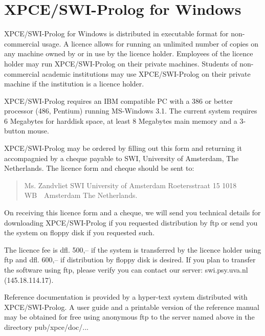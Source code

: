 \setlength{\textwidth}{6in}
\setlength{\textheight}{9in}
\setlength{\oddsidemargin}{1cm}
\setlength{\evensidemargin}{1cm}
\setlength{\parindent}{0in}
\setlength{\parskip}{5pt}
\nofiles


\section*{XPCE/SWI-Prolog for Windows}

XPCE/SWI-Prolog for Windows is distributed in executable format for
non-commercial usage.  A licence allows for running an unlimited number
of copies on any machine owned by or in use by the licence holder.
Employees of the licence holder may run XPCE/SWI-Prolog on their
private machines.  Students of non-commercial academic institutions
may use XPCE/SWI-Prolog on their private machine if the institution
is a licence holder.

XPCE/SWI-Prolog requires an IBM compatible PC with a 386 or better
processor (486, Pentium) running MS-Windows 3.1.  The current system
requires 6 Megabytes for harddisk space, at least 8 Megabytes main
memory and a 3-button mouse.

XPCE/SWI-Prolog may be ordered by filling out this form and returning it
accompagnied by a cheque payable to SWI, University of Amsterdam, The
Netherlands.  The licence form and cheque should be sent to:

\begin{quote}
{\obeylines\parskip 0pt
 Ms. Zandvliet
 SWI
 University of Amsterdam
 Roetersstraat 15
 1018 WB~~Amsterdam
 The Netherlands.
}
\end{quote}

On receiving this licence form and a cheque, we will send you technical
details for downloading XPCE/SWI-Prolog if you requested distribution by
ftp or send you the system on floppy disk if you requested such.

The licence fee is dfl.  500,-- if the system is transferred by the
licence holder using ftp and dfl.  600,-- if distribution by floppy
disk is desired.  If you plan to transfer the software using ftp, please
verify you can contact our server: swi.psy.uva.nl (145.18.114.17).

Reference documentation is provided by a hyper-text system distributed
with XPCE/SWI-Prolog.  A user guide and a printable version of the
reference manual may be obtained for free using anonymous ftp to
the server named above in the directory pub/xpce/doc/...

